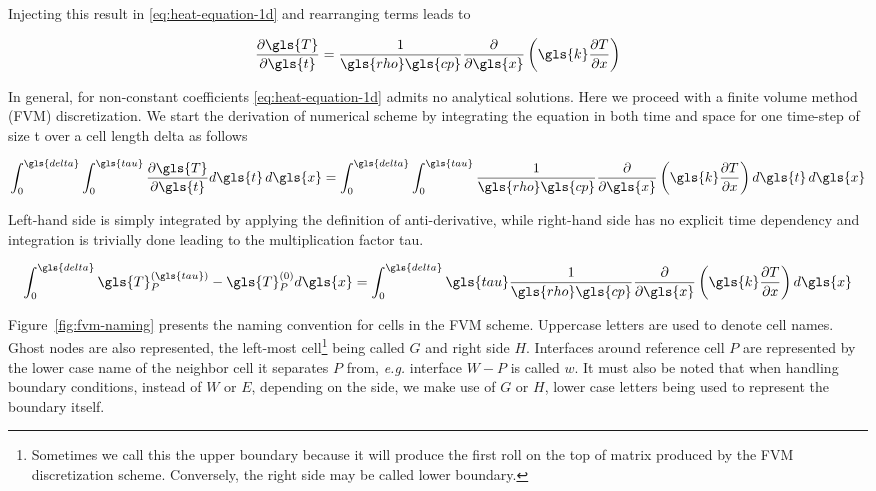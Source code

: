 \documentclass[12pt]{article}%
\begin{document}
Injecting this result in \eqref{eq:heat-equation-1d} and rearranging terms leads to

\begin{equation}
\partialdiff{\gls{T}}{\gls{t}} =
\frac{1}{\gls{rho}\gls{cp}}
\partialdiff{}{\gls{x}}\left(\gls{k}\partialdiff{T}{x}\right)
\label{eq:heat-equation-1d-simplified}
\end{equation}

In general, for non-constant coefficients \eqref{eq:heat-equation-1d} admits no analytical solutions. Here we proceed with a finite volume method (FVM) discretization. We start the derivation of numerical scheme by integrating the equation in both time and space for one time-step of size \gls{t} over a cell length \gls{delta} as follows

\begin{equation}
\int_{0}^{\gls{delta}}\int_{0}^{\gls{tau}}
\partialdiff{\gls{T}}{\gls{t}} d\gls{t}\,d\gls{x} =
\int_{0}^{\gls{delta}}\int_{0}^{\gls{tau}}
\frac{1}{\gls{rho}\gls{cp}}
\partialdiff{}{\gls{x}}\left(\gls{k}\partialdiff{T}{x}\right) d\gls{t}\,d\gls{x}
\end{equation}

Left-hand side is simply integrated by applying the definition of anti-derivative, while right-hand side has no explicit time dependency and integration is trivially done leading to the multiplication factor 
\gls{tau}.

\begin{equation}
\int_{0}^{\gls{delta}}
\gls{T}^{(\gls{tau})}_{P} - \gls{T}^{(0)}_{P} d\gls{x} =
\int_{0}^{\gls{delta}}
\gls{tau}\frac{1}{\gls{rho}\gls{cp}}
\partialdiff{}{\gls{x}}\left(\gls{k}\partialdiff{T}{x}\right) d\gls{x}
\end{equation}

Figure~\ref{fig:fvm-naming} presents the naming convention for cells in the FVM scheme. Uppercase letters are used to denote cell names. Ghost nodes are also represented, the left-most cell\footnote{Sometimes we call this the upper boundary because it will produce the first roll on the top of matrix produced by the FVM discretization scheme. Conversely, the right side may be called lower boundary.} being called $G$ and right side $H$. Interfaces around reference cell $P$ are represented by the lower case name of the neighbor cell it separates $P$ from, \emph{e.g.} interface $W-P$ is called $w$. It must also be noted that when handling boundary conditions, instead of $W$ or $E$, depending on the side, we make use of $G$ or $H$, lower case letters being used to represent the boundary itself.
\end{document}
